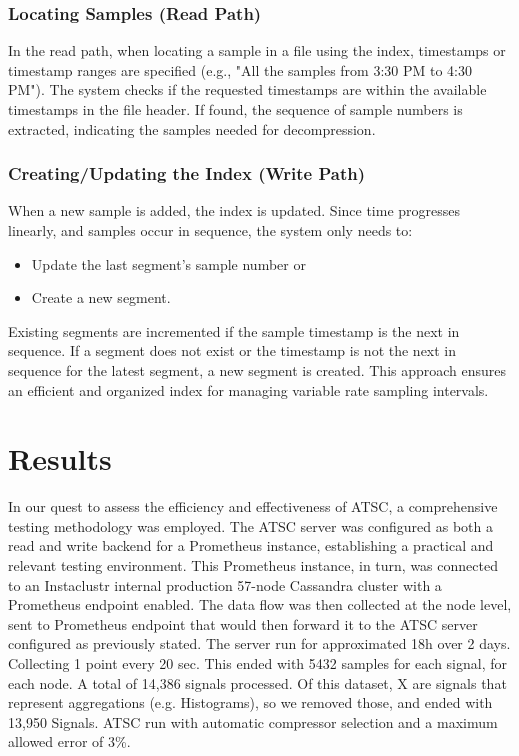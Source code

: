 \documentclass[conference]{IEEEtran}
\begin{document}
\subsubsection{Locating Samples (Read Path)}

In the read path, when locating a sample in a file using the index, timestamps or timestamp ranges are specified (e.g., "All the samples from 3:30 PM to 4:30 PM"). The system checks if the requested timestamps are within the available timestamps in the file header. If found, the sequence of sample numbers is extracted, indicating the samples needed for decompression.
\vspace{5pt}
\subsubsection{Creating/Updating the Index (Write Path)}

When a new sample is added, the index is updated. Since time progresses linearly, and samples occur in sequence, the system only needs to:
\begin{itemize}
    \item Update the last segment's sample number or
    \item Create a new segment.
\end{itemize}

Existing segments are incremented if the sample timestamp is the next in sequence. If a segment does not exist or the timestamp is not the next in sequence for the latest segment, a new segment is created. This approach ensures an efficient and organized index for managing variable rate sampling intervals.


\section{Results}

In our quest to assess the efficiency and effectiveness of ATSC, a comprehensive testing methodology was employed. 
The ATSC server was configured as both a read and write backend for a Prometheus instance, establishing a practical and relevant testing environment. 
This Prometheus instance, in turn, was connected to an Instaclustr internal production 57-node Cassandra cluster with a Prometheus endpoint enabled. 
The data flow was then collected at the node level, sent to Prometheus endpoint that would then forward it to the ATSC server configured as previously stated.
The server run for approximated 18h over 2 days. Collecting 1 point every 20 sec. This ended with 5432 samples for each signal, for each node.
A total of 14,386 signals processed.
Of this dataset, X are signals that represent aggregations (e.g. Histograms), so we removed those, and ended with 13,950 Signals.
ATSC run with automatic compressor selection and a maximum allowed error of 3\%.
\end{document}
